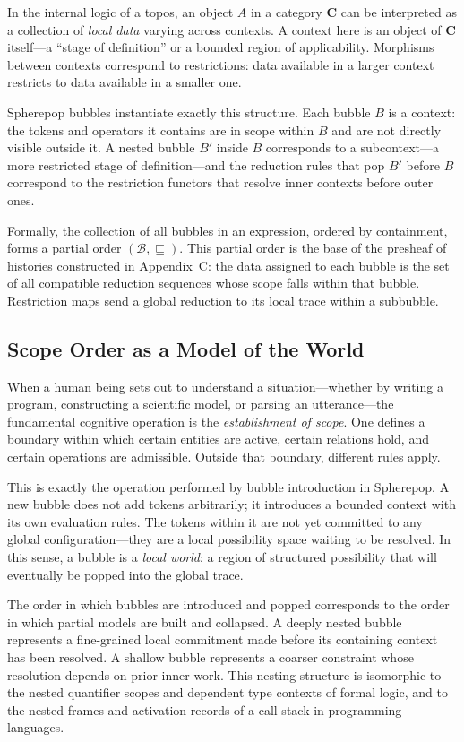 \documentclass[12pt, oneside]{amsbook}
\theoremstyle{plain}
\theoremstyle{definition}
\theoremstyle{remark}
\begin{document}
In the internal logic of a topos, an object $A$ in a category $\mathbf{C}$ can
be interpreted as a collection of \emph{local data} varying across contexts.
A context here is an object of $\mathbf{C}$ itself---a ``stage of definition''
or a bounded region of applicability. Morphisms between contexts correspond to
restrictions: data available in a larger context restricts to data available
in a smaller one.

Spherepop bubbles instantiate exactly this structure. Each bubble $B$ is a
context: the tokens and operators it contains are in scope within $B$ and
are not directly visible outside it. A nested bubble $B'$ inside $B$
corresponds to a subcontext---a more restricted stage of definition---and the
reduction rules that pop $B'$ before $B$ correspond to the restriction
functors that resolve inner contexts before outer ones.

Formally, the collection of all bubbles in an expression, ordered by containment,
forms a partial order $(\mathcal{B}, \sqsubseteq)$. This partial order is the
base of the presheaf of histories constructed in Appendix~C: the data assigned
to each bubble is the set of all compatible reduction sequences whose scope
falls within that bubble. Restriction maps send a global reduction to its
local trace within a subbubble.

\subsection{Scope Order as a Model of the World}

When a human being sets out to understand a situation---whether by writing
a program, constructing a scientific model, or parsing an utterance---the
fundamental cognitive operation is the \emph{establishment of scope}. One
defines a boundary within which certain entities are active, certain relations
hold, and certain operations are admissible. Outside that boundary, different
rules apply.

This is exactly the operation performed by bubble introduction in Spherepop.
A new bubble does not add tokens arbitrarily; it introduces a bounded context
with its own evaluation rules. The tokens within it are not yet committed to
any global configuration---they are a local possibility space waiting to be
resolved. In this sense, a bubble is a \emph{local world}: a region of
structured possibility that will eventually be popped into the global trace.

The order in which bubbles are introduced and popped corresponds to the order
in which partial models are built and collapsed. A deeply nested bubble
represents a fine-grained local commitment made before its containing context
has been resolved. A shallow bubble represents a coarser constraint whose
resolution depends on prior inner work. This nesting structure is isomorphic
to the nested quantifier scopes and dependent type contexts of formal logic,
and to the nested frames and activation records of a call stack in programming
languages.
\end{document}
